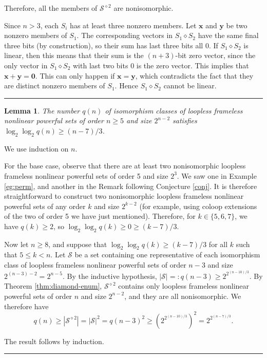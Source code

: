 \documentclass[12pt]{article}
\newtheorem{lem}[thm]{Lemma}
\def\pf{\noindent {\it Proof.\ }}
\def\qed{\hfill \rule{4pt}{7pt}}
\begin{document}
Therefore, all the members of $\mathcal{S}^{\diamond2}$ are nonisomorphic.

Since $n>3$, each $S_i$ has at least three nonzero members.  Let $\mathbf{x}$ and $\mathbf{y}$ be two nonzero members of $S_1$.  The corresponding vectors in $S_1 \diamond S_2$ have the same final three bits
(by construction), so their sum has last three bits all 0.  If $S_1 \diamond S_2$ is linear,
then this means that their sum is the $(n+3)$-bit zero vector,
since the only vector in $S_1 \diamond S_2$ with last two bits 0 is the zero vector.
This implies that $\mathbf{x}+\mathbf{y}=\mathbf{0}$.
This can only happen if $\mathbf{x}=\mathbf{y}$, which contradicts the
fact that they are distinct nonzero members of $S_1$.
Hence $S_1 \diamond S_2$ cannot be linear.
\qed

\begin{lem}
The number $q(n)$ of isomorphism classes of
loopless frameless nonlinear powerful sets of order $n\ge5$
and size $2^{n-2}$ satisfies $\log_2\log_2q(n)\ge(n-7)/3$.
\end{lem}

\pf We use induction on $n$.

For the base case, observe that there are at least two
nonisomorphic loopless frameless nonlinear powerful sets of order 5
and size $2^3$.  We saw one in Example \ref{eg:perm}, and another in the Remark
following Conjecture \ref{conj}.  It is therefore straightforward to construct two
nonisomorphic loopless frameless nonlinear powerful sets of any order $k$
and size $2^{k-2}$ (for example, using coloop extensions of the two of order 5 we have just
mentioned).
Therefore, for $k\in\{5,6,7\}$, we have
$q(k)\ge2$, so $\log_2\log_2q(k)\ge0\ge(k-7)/3$.

Now let $n\ge8$, and suppose that $\log_2\log_2q(k)\ge(k-7)/3$ for all $k$ such that
$5\le k<n$.  Let $\mathcal{S}$ be a set containing one representative of each isomorphism
class of loopless frameless nonlinear powerful sets
of order $n-3$ and size $2^{(n-3)-2}=2^{n-5}$.  By the inductive hypothesis,
$|\mathcal{S}|=:q(n-3)\ge2^{2^{(n-10)/3}}$.  By Theorem \ref{thm:diamond-enum},
$\mathcal{S}^{\diamond2}$ contains only loopless frameless nonlinear powerful sets of
order $n$ and size $2^{n-2}$, and they are all nonisomorphic.  We therefore have
\[
q(n)\ge|\mathcal{S}^{\diamond2}|=|\mathcal{S}|^2=q(n-3)^2\ge(2^{2^{(n-10)/3}})^2
=2^{2^{(n-7)/3}} .
\]

The result follows by induction.\qed
\end{document}
